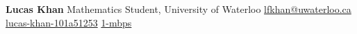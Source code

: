 \documentclass[12pt]{article}
\newcommand{\contact}[3]{{#1} \hspace{0.05em} \href{#2}{#3} \newline}
\begin{document}
\noindent\begin{minipage}[t]{0.3\textwidth}
  \vspace{0pt}
  \begin{flushleft}
      {\LARGE \textbf{Lucas Khan}} \newline
      {\large Mathematics Student, University of Waterloo} \newline \newline
      \contact{\faEnvelopeSquare}{mailto:lfkhan@uwaterloo.ca}{lfkhan@uwaterloo.ca}
      \contact{\faLinkedinSquare}{https://linkedin.com/in/lucas-khan-101a51253}{lucas-khan-101a51253}
      \contact{\faGithubSquare}{https://github.com/1-mbps}{1-mbps}
  \end{flushleft}
\end{minipage}%
\hspace{0.07\textwidth}%
\end{document}
